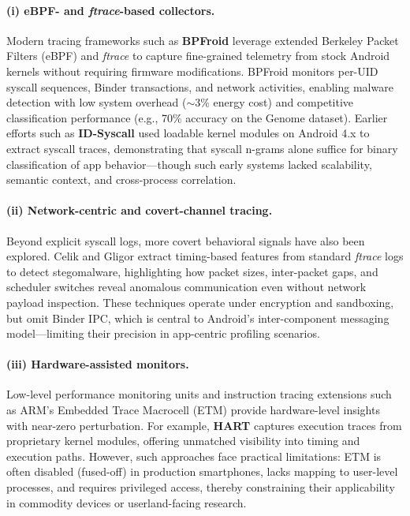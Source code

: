 \documentclass[a4paper,12pt]{report}
\begin{document}
\paragraph{(i) eBPF- and \textit{ftrace}-based collectors.}
Modern tracing frameworks such as \textbf{BPFroid} leverage extended Berkeley Packet Filters (eBPF) and \textit{ftrace} to capture fine-grained telemetry from stock Android kernels without requiring firmware modifications. BPFroid monitors per-UID syscall sequences, Binder transactions, and network activities, enabling malware detection with low system overhead ($\sim$3\% energy cost) and competitive classification performance (e.g., 70\% accuracy on the Genome dataset). Earlier efforts such as \textbf{ID-Syscall} used loadable kernel modules on Android 4.x to extract syscall traces, demonstrating that syscall n-grams alone suffice for binary classification of app behavior—though such early systems lacked scalability, semantic context, and cross-process correlation.

\paragraph{(ii) Network-centric and covert-channel tracing.}
Beyond explicit syscall logs, more covert behavioral signals have also been explored. Celik and Gligor extract timing-based features from standard \textit{ftrace} logs to detect stegomalware, highlighting how packet sizes, inter-packet gaps, and scheduler switches reveal anomalous communication even without network payload inspection. These techniques operate under encryption and sandboxing, but omit Binder IPC, which is central to Android’s inter-component messaging model—limiting their precision in app-centric profiling scenarios.

\paragraph{(iii) Hardware-assisted monitors.}
Low-level performance monitoring units and instruction tracing extensions such as ARM’s Embedded Trace Macrocell (ETM) provide hardware-level insights with near-zero perturbation. For example, \textbf{HART} captures execution traces from proprietary kernel modules, offering unmatched visibility into timing and execution paths. However, such approaches face practical limitations: ETM is often disabled (fused-off) in production smartphones, lacks mapping to user-level processes, and requires privileged access, thereby constraining their applicability in commodity devices or userland-facing research.
\end{document}
